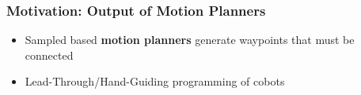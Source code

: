 \begin{frame}[t]
	\frametitle{Motivation: Output of Motion Planners}
	\begin{itemize}
		\item Sampled based \textbf{motion planners} generate waypoints that must be connected
		\item Lead-Through/Hand-Guiding programming of cobots
	\end{itemize}
\end{frame}

